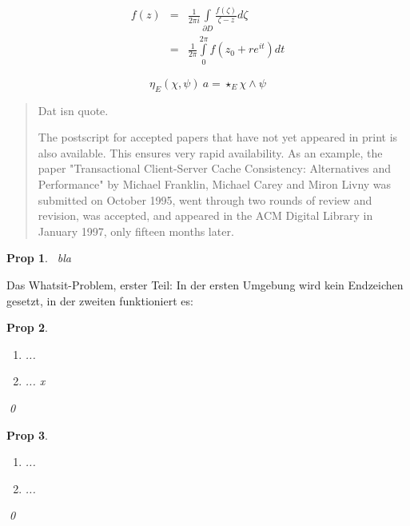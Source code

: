 \documentclass[twoside,11pt]{article}
\newtheorem*{Prop}{Prop}
\theoremstyle{lines}
\theoremstyle{longplain}
\begin{document}
\begin{Proof}
\begin{eqnarray*}
f(z) &=&
   \frac{1}{2\pi i}
   \int \limits_{\partial D} \frac{f(\zeta)}{\zeta-z} d\zeta \\
&= &
   \frac{1}{2\pi}
   \int \limits_0^{2\pi}
      f(z_0 + re^{it}) dt
\end{eqnarray*}
\end{Proof}

\begin{equation}
\eta_E(\chi,\psi) \: a  = \star_E \chi \wedge \psi \label{hodgestar}
\end{equation}

\begin{Proposition}
  \begin{quote}
Dat isn quote.
   
The postscript for accepted papers that have not yet appeared in print
is also available. This ensures very rapid availability. As an example,
the paper "Transactional Client-Server Cache Consistency: Alternatives
and Performance" by Michael Franklin, Michael Carey and Miron Livny
was submitted on October 1995, went through two rounds of review and
revision, was accepted, and appeared in the ACM Digital Library in
January 1997, only fifteen months later.
  \end{quote}
\end{Proposition}

\begin{Prop}\
bla
\end{Prop}

Das Whatsit-Problem, erster Teil:
In der ersten Umgebung wird kein Endzeichen gesetzt, in der
zweiten funktioniert es:

\begin{Prop}\
\begin{enumerate}
\item ...
\item ...\label{bla} x
\end{enumerate}
\qed\end{Prop}

\begin{Prop}\
\begin{enumerate}
\item ... \label{bla}
\item ...
\end{enumerate}
\qed\end{Prop}
\end{document}
